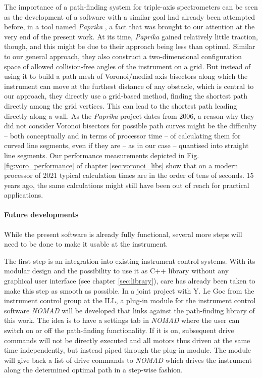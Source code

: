 The importance of a path-finding system for triple-axis spectrometers can be seen as the development 
of a software with a similar goal had already been attempted before, in a tool named 
\textit{Paprika} \cite{Muehlbauer2006}, a fact that was brought to our attention at the very end of the present work.
At its time, \textit{Paprika} gained relatively little traction, though, and this might be due to their approach 
being less than optimal.
Similar to our general approach, they also construct a two-dimensional configuration space of allowed collision-free 
angles of the instrument on a grid. But instead of using it to build a path mesh of Voronoi/medial axis 
bisectors along which the instrument can move at the furthest distance of any obstacle, which is central 
to our approach, they directly use a grid-based method, finding the shortest path directly among the grid vertices.
This can lead to the shortest path leading directly along a wall.
As the \textit{Paprika} project dates from 2006, a reason why they did not consider Voronoi bisectors 
for possible path curves might be the difficulty -- both conceptually and in terms of processor time -- 
of calculating them for curved line segments, even if they are -- as in our case -- quantised into straight 
line segments.
Our performance measurements depicted in Fig. \ref{fig:voro_performance} of chapter \ref{sec:voronoi_libs}
show that on a modern processor of 2021 typical calculation times are in the order of tens of seconds.
15 years ago, the same calculations might still have been out of reach for practical applications.


\paragraph{Future developments}
While the present software is already fully functional, several more steps will need to be done 
to make it usable at the instrument.

The first step is an integration into existing instrument control systems. 
With its modular design and the possibility to use it as C++ library without any graphical user interface
(see chapter \ref{sec:library}), care has already been taken to make this step as smooth as possible.
In a joint project with Y. Le Goc from the instrument control group at the ILL, a plug-in module for
the instrument control software \textit{NOMAD} \cite{web_NOMAD} will be developed that links against 
the path-finding library of this work. 
The idea is to have a settings tab in \textit{NOMAD} where the user can switch on or off the path-finding
functionality. If it is on, subsequent drive commands will not be directly executed and all motors thus
driven at the same time independently, but instead piped through the plug-in module. 
The module will give back a list of drive commands to \textit{NOMAD} which drives the instrument
along the determined optimal path in a step-wise fashion.

